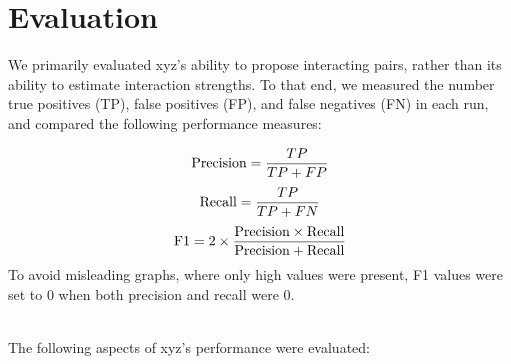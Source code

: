 \section{Evaluation}

We primarily evaluated xyz's ability to propose interacting pairs, rather than its ability to estimate interaction strengths. To that end, we measured the number true positives (TP), false positives (FP), and false negatives (FN) in each run, and compared the following performance measures:

$$\textnormal{Precision} = \frac{TP}{TP + FP}$$
$$\textnormal{Recall} = \frac{TP}{TP + FN}$$
$$\textnormal{F1} = 2 \times \frac{\textnormal{Precision} \times \textnormal{Recall}}{\textnormal{Precision} + \textnormal{Recall}}$$
To avoid misleading graphs, where only high values were present, F1 values were set to $0$ when both precision and recall were 0.

~\\
The following aspects of xyz's performance were evaluated:

